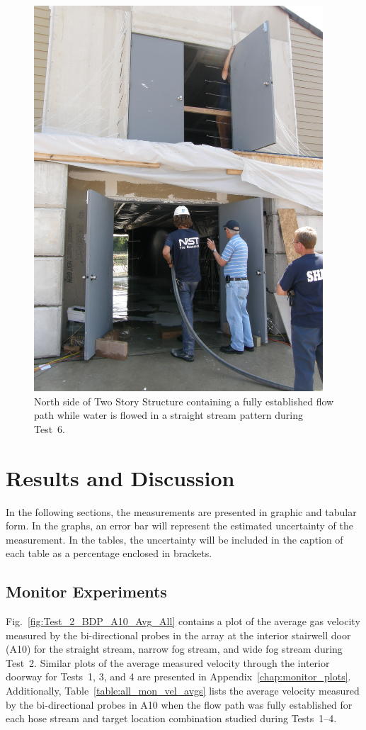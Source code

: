 \documentclass[12pt,oneside]{book}
\begin{document}
\begin{figure}[!ht]
	\includegraphics[width=4.25in]{../Figures/Pictures/Test_18}
	\caption[North side of Two Story Structure containing a fully established flow path during Test~6.]{North side of Two Story Structure containing a fully established flow path while water is flowed in a straight stream pattern during Test~6.}
	\label{fig:test_6_pic}
\end{figure}
\FloatBarrier

\chapter{Results and Discussion}
\label{chap:results}
In the following sections, the measurements are presented in graphic and tabular form. In the graphs, an error bar will represent the estimated uncertainty of the measurement. In the tables, the uncertainty will be included in the caption of each table as a percentage enclosed in brackets.

\section{Monitor Experiments}
\label{sec:monitor_results}
Fig.~\ref{fig:Test_2_BDP_A10_Avg_All} contains a plot of the average gas velocity measured by the bi-directional probes in the array at the interior stairwell door (A10) for the straight stream, narrow fog stream, and wide fog stream during Test~2. Similar plots of the average measured velocity through the interior doorway for Tests~1, 3, and 4 are presented in Appendix~\ref{chap:monitor_plots}. Additionally, Table~\ref{table:all_mon_vel_avgs} lists the average velocity measured by the bi-directional probes in A10 when the flow path was fully established for each hose stream and target location combination studied during Tests~1--4.
\end{document}
